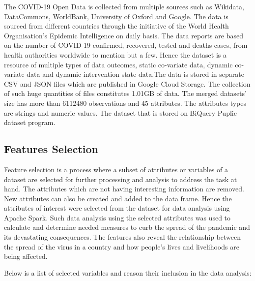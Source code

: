 \documentclass[12pt]{article}
\begin{document}
The COVID-19 Open Data is collected from multiple sources such as Wikidata, DataCommons, WorldBank, University of Oxford and Google. The data is sourced from different countries through the initiative of the World Health Organisation's Epidemic Intelligence on daily basis\cite{covid-19}. The data reports are based on the number of COVID-19  confirmed, recovered, tested and deaths cases, from health authorities worldwide to mention but a few. Hence the dataset is a resource of multiple types of data outcomes, static co-variate data, dynamic co-variate data and dynamic intervention state data\cite{covid-19}.The data is stored in separate CSV and JSON files which are published in Google Cloud Storage. The collection of such huge quantities of files constitutes 1.01GB of data.  The merged datasets' size has  more than 6112480 observations and 45 attributes.  The attributes types are strings and numeric values. The dataset that is stored on BiQuery Puplic dataset program.

\subsection{Features Selection}
Feature selection is a process where a subset of attributes or variables of a dataset are selected for further processing  and analysis to address the task at hand. The attributes which are  not having interesting information are removed. New  attributes can also be created and added to the data frame. Hence the  attributes  of interest were selected from the dataset for data analysis using Apache Spark.  Such data analysis using the selected attributes was used to calculate and determine needed measures to curb the spread of the pandemic and its devastating consequences. The features also reveal the relationship between the spread of the virus in a country and how people's lives and livelihoods are being affected.

Below is a list of selected variables and reason their inclusion in the data analysis:
\end{document}
